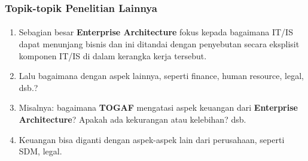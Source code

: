 \documentclass[aspectratio=169, table]{beamer}
\begin{document}
	\begin{frame}
		\frametitle{Topik-topik Penelitian Lainnya}
		\framesubtitle{\hspace{1cm}}
		\begin{enumerate}
			\item Sebagian besar \textbf{Enterprise Architecture} fokus kepada bagaimana IT/IS dapat menunjang bisnis dan ini ditandai dengan penyebutan secara eksplisit komponen IT/IS di dalam kerangka kerja tersebut.
			\item Lalu bagaimana dengan aspek lainnya, seperti finance, human resource, legal, dsb.?
			\item Misalnya: bagaimana \textbf{TOGAF} mengatasi aspek keuangan dari \textbf{Enterprise Architecture}? Apakah ada kekurangan atau kelebihan? dsb.
			\item Keuangan bisa diganti dengan aspek-aspek lain dari perusahaan, seperti SDM, legal.
		\end{enumerate}
	\end{frame}
	
\end{document}
